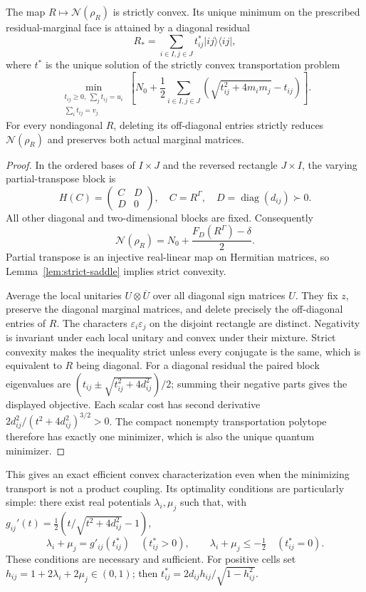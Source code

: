 \begin{theorem}\label{thm:negativity-transport}
The map $R\mapsto\mathcal N(\rho_R)$ is strictly convex. Its unique minimum
on the prescribed residual-marginal face is attained by a diagonal
residual
\[
 R_* = \sum_{i\in I,j\in J}t^*_{ij}|ij\rangle\langle ij|,
\]
where $t^*$ is the unique solution of the strictly convex transportation
problem
\[
 \boxed{\quad
 \min_{\substack{t_{ij}\ge0,\ \sum_jt_{ij}=u_i\\
                        \sum_it_{ij}=v_j}}
 \left[N_0+\frac12\sum_{i\in I,j\in J}
       \left(\sqrt{t_{ij}^2+4m_i m_j}-t_{ij}\right)\right].
 \quad}
\]
For every nondiagonal $R$, deleting its off-diagonal entries strictly
reduces $\mathcal N(\rho_R)$ and preserves both actual marginal matrices.
\end{theorem}
\begin{proof}
In the ordered bases of $I\times J$ and the reversed rectangle
$J\times I$, the varying partial-transpose block is
\[
 H(C)=\begin{pmatrix}C&D\\D&0\end{pmatrix},
 \quad C=R^\Gamma,\quad D=\operatorname{diag}(d_{ij})\succ0.
\]
All other diagonal and two-dimensional blocks are fixed. Consequently
\[
 \mathcal N(\rho_R)=N_0+\frac{F_D(R^\Gamma)-\delta}{2}.
\]
Partial transpose is an injective real-linear map on Hermitian matrices,
so Lemma~\ref{lem:strict-saddle} implies strict convexity.

Average the local unitaries $U\otimes\overline U$ over all diagonal
sign matrices $U$. They fix $z$, preserve the diagonal marginal matrices,
and delete precisely the off-diagonal entries of $R$. The characters
$\varepsilon_i\varepsilon_j$ on the disjoint rectangle are distinct.
Negativity is invariant under each local unitary and convex under their
mixture. Strict convexity makes the inequality strict unless every
conjugate is the same, which is equivalent to $R$ being diagonal.
For a diagonal residual the paired block eigenvalues are
$(t_{ij}\pm\sqrt{t_{ij}^2+4d_{ij}^2})/2$; summing their negative parts gives
the displayed objective. Each scalar cost has second derivative
$2d_{ij}^2/(t^2+4d_{ij}^2)^{3/2}>0$.
The compact nonempty transportation polytope therefore has exactly one
minimizer, which is also the unique quantum minimizer.
\end{proof}

This gives an exact efficient convex characterization even when the
minimizing transport is not a product coupling. Its optimality conditions
are particularly simple: there exist real potentials $\lambda_i,\mu_j$
such that, with
$g_{ij}'(t)=\tfrac12(t/\sqrt{t^2+4d_{ij}^2}-1)$,
\[
 \lambda_i+\mu_j=g'_{ij}(t^*_{ij})\quad(t^*_{ij}>0),
 \qquad \lambda_i+\mu_j\le-\tfrac12\quad(t^*_{ij}=0).
\]
These conditions are necessary and sufficient. For positive cells set
$h_{ij}=1+2\lambda_i+2\mu_j\in(0,1)$; then
$t^*_{ij}=2d_{ij}h_{ij}/\sqrt{1-h_{ij}^2}$.

